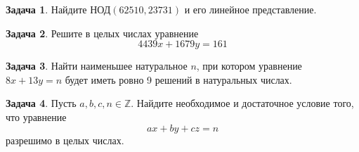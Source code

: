 \documentclass[12pt, fleqn]{extarticle}
\newcommand{\integer}{\mathbb{Z}}
\theoremstyle{definition}
\newtheorem{problem}{Задача}
\theoremstyle{remark}
\begin{document}
\begin{problem}
Найдите $\text{НОД}(62510,23731)$
и его линейное представление.
\end{problem}

\begin{problem}
Решите в целых числах уравнение
$$4439x + 1679y= 161$$
\end{problem}

\begin{problem}
Найти наименьшее натуральное $n$, 
при котором уравнение $8x + 13y = n$ 
будет иметь ровно 9 решений в натуральных числах.
\end{problem}


\begin{problem}
Пусть $a, b, c, n \in \integer$.
Найдите необходимое и достаточное условие того, что
уравнение
$$ax + by + cz = n$$
разрешимо в целых числах.
\end{problem}
\end{document}
